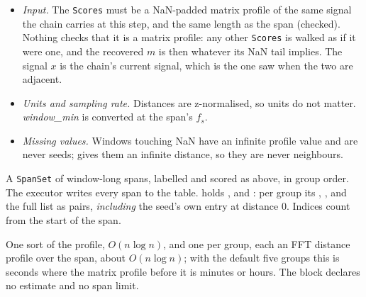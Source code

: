 \begin{itemize}
\item \emph{Input.} The \texttt{Scores} must be a NaN-padded matrix profile of the same signal the
  chain carries at this step, and the same length as the span (checked). Nothing checks that it is a
  matrix profile: any other \texttt{Scores} is walked as if it were one, and the recovered $m$ is
  then whatever its NaN tail implies. The signal $x$ is the chain's current signal, which is the one
   saw when the two are adjacent.
\item \emph{Units and sampling rate.} Distances are z-normalised, so units do not matter.
  \emph{window\_min} is converted at the span's $f_s$.
\item \emph{Missing values.} Windows touching NaN have an infinite profile value and are never
  seeds;  gives them an infinite distance, so they are never neighbours.
\end{itemize}

A \texttt{SpanSet} of window-long spans, labelled and scored as above, in group order. The executor
writes every span to the  table.  holds ,  and
: per group its , ,  and the full
 list as  pairs, \emph{including} the seed's own entry at
distance 0. Indices count from the start of the span.

One sort of the profile, $O(n \log n)$, and one  per group, each an FFT
distance profile over the span, about $O(n \log n)$; with the default five groups this is seconds
where the matrix profile before it is minutes or hours. The block declares no estimate and no span
limit.

